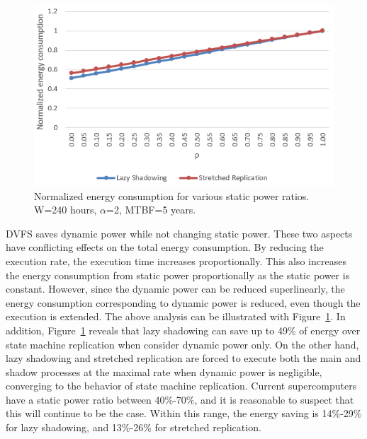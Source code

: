 \begin{figure}[!t]	
	\begin{center}
		\includegraphics[width=\columnwidth]{figures/rho.png}
	\end{center}
	\caption{Normalized energy consumption for various static power ratios. W=240 hours, $\alpha$=2, MTBF=5 years.}
	\label{fig:rho}
\end{figure}

DVFS saves dynamic power while not changing static power. These two aspects have conflicting effects on the total energy consumption. By reducing the execution rate, the execution time increases proportionally. This also increases the energy consumption from static power proportionally as the static power is constant. However, since the dynamic power can be reduced superlinearly, the energy consumption corresponding to dynamic power is reduced, even though the execution is extended. The above analysis can be illustrated with Figure~\ref{fig:rho}. In addition, Figure~\ref{fig:rho} reveals that lazy shadowing can save up to 49\% of energy over state machine replication when consider dynamic power only. On the other hand, lazy shadowing and stretched replication are forced to execute both the main and shadow processes at the maximal rate when dynamic power is negligible, converging to the behavior of state machine replication. Current supercomputers have a static power ratio between 40\%-70\%, and it is reasonable to suspect that this will continue to be the case. Within this range, the energy saving is 14\%-29\% for lazy shadowing, and 13\%-26\% for stretched replication.

